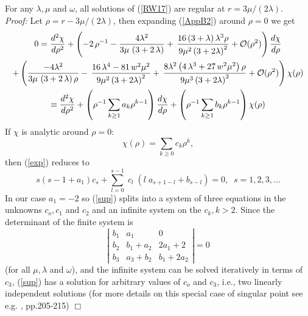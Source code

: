 \documentclass[12pt,aps,floats,showpacs,amssymb,tightenlines]{revtex4}
\renewcommand{\r}{\rho}
\begin{document}
 For any $\lambda,\mu$ and $\omega$, all
solutions of
(\ref{RW17}) are regular at $r=3 \mu /  (2 \lambda)$.\\
{\em Proof:} Let $\rho = r- 3 \mu / (2 \lambda)$, then expanding
(\ref{AppB2}) around $\r=0$ we get
   \begin{multline} \label{exp}
0 = \frac{d^2 \chi}{d \rho^2} + \left( -2\,{\rho}^{-1}-{\frac
{4{\lambda}^{2}}{3 \mu\, \left( 3+2\,\lambda
 \right) }}+\,{\frac {16 \left( 3+\lambda \right) {
\lambda}^{3}\rho}{9{\mu}^{2} \left( 3+2 \lambda
 \right)^2 }} + {\cal O} (\rho^2) \right) \frac{d \chi}{d \rho} \\+
 \left({\frac {-4{\lambda}^{2}}{3 \mu\, \left( 3+2\,\lambda \right) \rho}}-
\,{\frac {16\,{\lambda}^{4}-81\,{w}^{2}{\mu}^{2}}{9{\mu}^{2} \left(
3+2\lambda \right)^2 }}+\,{\frac {8{ \lambda}^{2} \left(
4\,{\lambda}^{3}+27\,{w}^{2}{\mu}^{2} \right) \rho }{9{\mu}^{3}
  \left( 3+2\lambda \right)^3 }} + {\cal{O}}(\rho^2) \right)
\chi(\rho) \\
\equiv \frac{d^2 \chi}{d \rho^2} + \left( \r ^{-1} \sum_{k\geq 1}
a_k \rho^{k-1} \right) \frac{d \chi}{d \rho} + \left( \r ^{-1}
\sum_{k\geq 1} b_k \rho^{k-1} \right) \chi(\rho)
 \end{multline}
 If $\chi$ is analytic around $\rho=0$:
\begin{equation}
\chi(\rho) = \sum_{k\geq 0} c_k \rho^{k},
\end{equation}
then (\ref{exp}) reduces to
\begin{equation} \label{sup}
s \left( s-1 + a_1\right) c_{{s}}+\sum _{l=0}^{s-1} \; c_{{l}} \;
\left( l \; a_{{s+1-l}} +  b_{{s-l}} \right)  = 0 , \;\; s=1,2,3,...
\end{equation}
In our case $a_1=-2$ so (\ref{sup}) splits into a system of three
equations in the unknowns $c_o,c_1$ and $c_2$ and an infinite system
on the $c_k, k>2$. Since the determinant of the finite system is
\begin{equation} \left|
 \begin{matrix} b_1 & a_1 & 0 \\ b_2 & b_1+a_2 & 2 a_1+2\\
 b_3 & a_3+b_2 & b_1+2 a_2 \end{matrix}  \right| = 0
 \end{equation}
 (for all $\mu,\lambda$ and $\omega$),
and the infinite system can be solved iteratively in terms of $c_3$,
(\ref{sup}) has a solution for arbitrary values of $c_o$ and $c_3$,
i.e., two linearly independent solutions (for more details on this
special case of singular point see e.g. \cite{braun}, pp.205-215)
$\Box$
\end{document}
